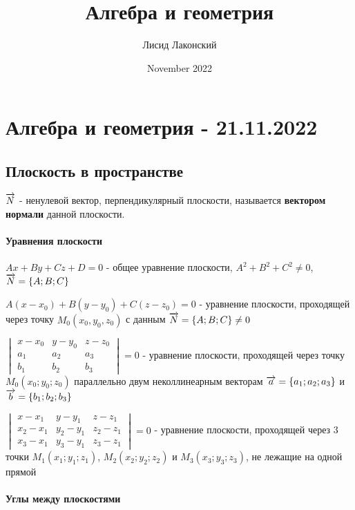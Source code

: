 \documentclass{article}
\title{Алгебра и геометрия}
\author{Лисид Лаконский}
\date{November 2022}
\def\vec{\ensuremath\overrightarrow}
\begin{document}
\maketitle

\tableofcontents
\pagebreak

\section{Алгебра и геометрия - 21.11.2022}

\subsection{Плоскость в пространстве}

\begin{flushleft}

$\vec{N}$ - ненулевой вектор, перпендикулярный плоскости, называется \textbf{вектором нормали} данной плоскости.

\paragraph{Уравнения плоскости}

$Ax + By + C z + D = 0$ - общее уравнение плоскости, $A^2 + B^2 + C^2 \ne 0$, $\vec{N} = \{ A; B; C \}$

$A(x - x_0) + B(y - y_0) + C(z - z_0) = 0$ - уравнение плоскости, проходящей через точку $M_0(x_0, y_0, z_0)$ с данным $\vec{N} = \{ A; B; C \} \ne 0$ 


$\begin{vmatrix}
    x - x_0 & y - y_0 & z - z_0 \\
    a_1 & a_2 & a_3 \\
    b_1 & b_2 & b_3
\end{vmatrix} = 0$ - 
уравнение плоскости, проходящей через точку $M_0(x_0; y_0; z_0)$ параллельно двум неколлинеарным векторам $\vec{a} = \{ a_1; a_2; a_3 \}$ и $\vec{b} = \{ b_1; b_2; b_3 \}$

$\begin{vmatrix}
    x - x_1 & y - y_1 & z - z_1 \\
    x_2 - x_1 & y_2 - y_1 & z_2 - z_1 \\
    x_3 - x_1 & y_3 - y_1 & z_3 - z_1
\end{vmatrix} = 0$ - уравнение плоскости, проходящей через 3 точки $M_1(x_1; y_1; z_1)$, $M_2(x_2; y_2; z_2)$ и $M_3(x_3; y_3; z_3)$, не лежащие на одной прямой

\paragraph{Углы между плоскостями}


\end{flushleft}
\end{document}
